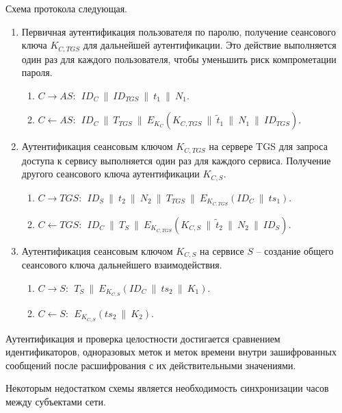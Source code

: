 Схема протокола следующая.
\begin{enumerate}
    \item Первичная аутентификация пользователя по паролю, получение сеансового ключа $K_{C,TGS}$ для дальнейшей аутентификации. Это действие выполняется один раз для каждого пользователя, чтобы уменьшить риск компрометации пароля.
        \begin{enumerate}
            \item $C \rightarrow AS: ~~ ID_C ~\|~ ID_{TGS} ~\|~ t_1 ~\|~ N_1$.
            \item $C \leftarrow AS: ~~ ID_C ~\|~ T_{TGS} ~\|~ E_{K_C}( K_{C,TGS} ~\|~ \tilde{t}_1 ~\|~ N_1 ~\|~ ID_{TGS})$.
        \end{enumerate}
    \item Аутентификация сеансовым ключом $K_{C,TGS}$ на сервере TGS для запроса доступа к сервису выполняется один раз для каждого сервиса. Получение другого сеансового ключа аутентификации $K_{C,S}$.
        \begin{enumerate}
            \item $C \rightarrow TGS: ~~ ID_S ~\|~ t_2 ~\|~ N_2 ~\|~ T_{TGS} ~\|~ E_{K_{C,TGS}}(ID_C ~\|~ ts_1)$.
            \item $C \leftarrow TGS: ~~ ID_C ~\|~ T_{S} ~\|~ E_{K_{C,TGS}}( K_{C,S} ~\|~ \tilde{t}_2 ~\|~ N_2 ~\|~ ID_S)$.
        \end{enumerate}
    \item Аутентификация сеансовым ключом $K_{C,S}$ на сервисе $S$ -- создание общего сеансового ключа дальнейшего взаимодействия.
        \begin{enumerate}
            \item $C \rightarrow S: ~~ T_{S} ~\|~ E_{K_{C,S}}(ID_C ~\|~ ts_2 ~\|~ K_1)$.
            \item $C \leftarrow S: ~~ E_{K_{C,S}}( ts_2 ~\|~ K_2)$.
        \end{enumerate}
\end{enumerate}

Аутентификация и проверка целостности достигается сравнением идентификаторов, одноразовых меток и меток времени внутри зашифрованных сообщений после расшифрования с их действительными значениями.

Некоторым недостатком схемы является необходимость синхронизации часов между субъектами сети.
